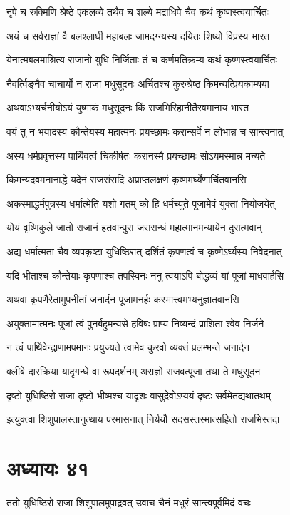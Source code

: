 \twolineshloka
{नृपे च रुक्मिणि श्रेष्ठे एकलव्ये तथैव च}
{शल्ये मद्राधिपे चैव कथं कृष्णस्त्वयार्चितः}


\twolineshloka
{अयं च सर्वराज्ञां वै बलश्लाघी महाबलः}
{जामदग्न्यस्य दयितः शिष्यो विप्रस्य भारत}


\twolineshloka
{येनात्मबलमाश्रित्य राजानो युधि निर्जिताः}
{तं च कर्णमतिक्रम्य कथं कृष्णस्त्वयार्चितः}


\twolineshloka
{नैवर्त्विङ्नैव चाचार्यो न राजा मधुसूदनः}
{अर्चितश्च कुरुश्रेष्ठ किमन्यत्प्रियकाम्यया}


\twolineshloka
{अथवाऽभ्यर्चनीयोऽयं युष्माकं मधुसूदनः}
{किं राजभिरिहानीतैरवमानाय भारत}


\twolineshloka
{वयं तु न भयादस्य कौन्तेयस्य महात्मनः}
{प्रयच्छामः करान्सर्वे न लोभान्न च सान्त्वनात्}


\twolineshloka
{अस्य धर्मप्रवृत्तस्य पार्थिवत्वं चिकीर्षतः}
{करानस्मै प्रयच्छामः सोऽयमस्मान्न मन्यते}


\twolineshloka
{किमन्यदवमनानाद्धे यदेनं राजसंसदि}
{अप्राप्तलक्षणं कृष्णमर्घ्येणार्चितवानसि}


\twolineshloka
{अकस्माद्धर्मपुत्रस्य धर्मात्मेति यशो गतम्}
{को हि धर्मच्युते पूजामेवं युक्तां नियोजयेत्}


\twolineshloka
{योयं वृष्णिकुले जातो राजानं हतवान्पुरा}
{जरासन्धं महात्मानमन्यायेन दुरात्मवान्}


\twolineshloka
{अद्य धर्मात्मता चैव व्यपकृष्टा युधिष्ठिरात्}
{दर्शितं कृपणत्वं च कृष्णेऽर्घ्यस्य निवेदनात्}


\twolineshloka
{यदि भीताश्च कौन्तेयाः कृपणाश्च तपस्विनः}
{ननु त्वयाऽपि बोद्धव्यं यां पूजां माधवार्हसि}


\twolineshloka
{अथवा कृपणैरेतामुपनीतां जनार्दन}
{पूजामनर्हः कस्मात्त्वमभ्यनुज्ञातवानसि}


\twolineshloka
{अयुक्तामात्मनः पूजां त्वं पुनर्बहुमन्यसे}
{हविषः प्राप्य निष्यन्दं प्राशिता श्वेव निर्जने}


\twolineshloka
{न त्वं पार्थिवेन्द्राणामपमानः प्रयुज्यते}
{त्वामेव कुरवो व्यक्तं प्रलम्भन्ते जनार्दन}


\twolineshloka
{क्लीबे दारक्रिया यादृगन्धे वा रूपदर्शनम्}
{अराज्ञो राजवत्पूजा तथा ते मधुसूदन}


\twolineshloka
{दृष्टो युधिष्ठिरो राजा दृष्टो भीष्मश्च यादृशः}
{वासुदेवोऽप्ययं दृष्टः सर्वमेतद्यथातथम्}


\twolineshloka
{इत्युक्त्वा शिशुपालस्तानुत्थाय परमासनात्}
{निर्ययौ सदसस्तस्मात्सहितो राजभिस्तदा}


\chapter{अध्यायः ४१}
\twolineshloka
{ततो युधिष्ठिरो राजा शिशुपालमुपाद्रवत्}
{उवाच चैनं मधुरं सान्त्वपूर्वमिदं वचः}


